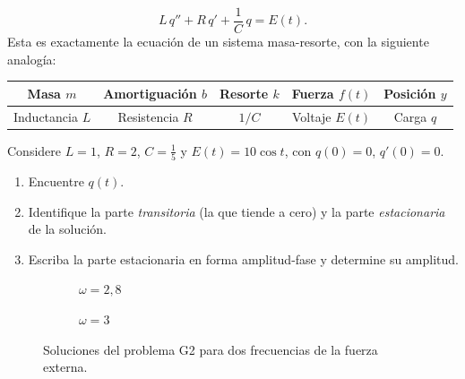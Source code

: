 \begin{enumerate}[label=\textbf{G\arabic*.}, leftmargin=*]
    \[
    L\,q''+R\,q'+\dfrac{1}{C}\,q=E(t).
    \]
    Esta es exactamente la ecuaci\'on de un sistema masa-resorte, con la siguiente analog\'ia:
    \begin{center}
    \renewcommand{\arraystretch}{1.3}
    \begin{tabular}{|c|c|c|c|c|}
    \hline
    Masa $m$ & Amortiguaci\'on $b$ & Resorte $k$ & Fuerza $f(t)$ & Posici\'on $y$\\ \hline
    Inductancia $L$ & Resistencia $R$ & $1/C$ & Voltaje $E(t)$ & Carga $q$\\ \hline
    \end{tabular}
    \end{center}
    Considere $L=1$, $R=2$, $C=\frac15$ y $E(t)=10\cos t$, con $q(0)=0$, $q'(0)=0$.
    \begin{enumerate}[label=\alph*)]
        \item Encuentre $q(t)$.
        \item Identifique la parte \emph{transitoria} (la que tiende a cero) y la parte \emph{estacionaria} de la soluci\'on.
        \item Escriba la parte estacionaria en forma amplitud-fase y determine su amplitud.
    \end{enumerate}
\end{enumerate}

\begin{figure}[h!]
    \centering
    \begin{subfigure}[b]{0.48\textwidth}
        \centering
        \caption{$\omega=2{,}8$}
    \end{subfigure}
    \hfill
    \begin{subfigure}[b]{0.48\textwidth}
        \centering
        \caption{$\omega=3$}
    \end{subfigure}
    \caption{Soluciones del problema G2 para dos frecuencias de la fuerza externa.}
    \label{fig:pulsaciones}
\end{figure}

